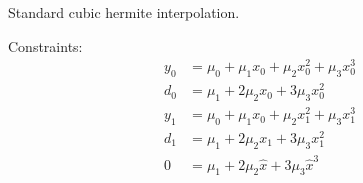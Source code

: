 
\label{sec:Monomial-cubic-hermite}

Standard cubic hermite interpolation.

Constraints:
\begin{equation}
\begin{aligned}
y_0 & = \mu_0 + \mu_1 x_0 + \mu_2 x_0^{2}  + \mu_3 x_0^{3}  
\\
d_0 & = \mu_1 + 2 \mu_2 x_0 + 3 \mu_3 x_0^{2} 
\\
y_1 & = \mu_0 + \mu_1 x_0+\mu_2 x_1^{2}  + \mu_3 x_1^{3}  
\\
d_1 & = \mu_1 + 2 \mu_2 x_1 + 3 \mu_3 x_1^{2} 
\\
0 & = \mu_1 + 2 \mu_2 \hat{x}  + 3 \mu_3 \hat{x}^3  
\end{aligned}
\end{equation}

